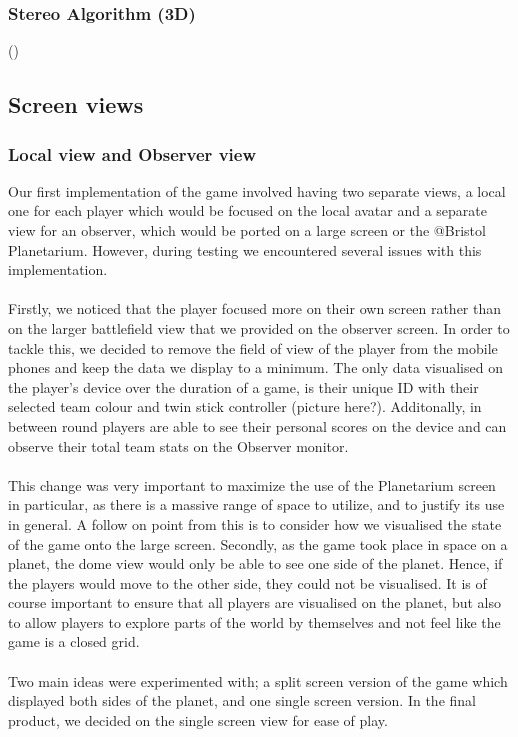 \documentclass[11pt,a4paper]{article}
\begin{document}
  \subsubsection{Stereo Algorithm (3D)}

  \begin{algorithm}[H]
    \LinesNumbered
    \Fn(){}{
    }
  \end{algorithm}

  \pagebreak
  \subsection{Screen views}


   \subsubsection{Local view and Observer view}

   Our first implementation of the game involved having two separate views, a local one for each player which would be focused on the local avatar and a separate view for an observer, which would be ported on a large screen or the @Bristol Planetarium. However, during testing we encountered several issues with this implementation. \\ \\
   Firstly, we noticed that the player focused more on their own screen rather than on the larger battlefield view that we provided on the observer screen. In order to tackle this, we decided to remove the field of view of the player from the mobile phones and keep the data we display to a minimum. The only data visualised on the player’s device over the duration of a game, is their unique ID with their selected team colour and twin stick controller (picture here?). Additonally, in between round players are able to see their personal scores on the device and can observe their total team stats on the Observer monitor. \\ \\
   This change was very important to maximize the use of the Planetarium screen in particular, as there is a massive range of space to utilize, and to justify its use in general. A follow on point from this is to consider how we visualised the state of the game onto the large screen. 
   Secondly, as the game took place in space on a planet, the dome view would only be able to see one side of the planet. Hence, if the players would move to the other side, they could not be visualised. It is of course important to ensure that all players are visualised on the planet, but also to allow players to explore parts of the world by themselves and not feel like the game is a closed grid. \\ \\  
   Two main ideas were experimented with; a split screen version of the game which displayed both sides of the planet, and one single screen version. In the final product, we decided on the single screen view for ease of play.
\end{document}
